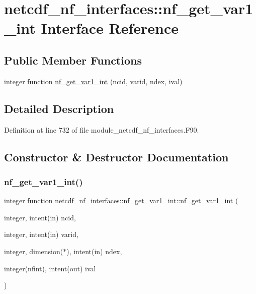 \hypertarget{interfacenetcdf__nf__interfaces_1_1nf__get__var1__int}{}\section{netcdf\+\_\+nf\+\_\+interfaces\+:\+:nf\+\_\+get\+\_\+var1\+\_\+int Interface Reference}
\label{interfacenetcdf__nf__interfaces_1_1nf__get__var1__int}
\subsection*{Public Member Functions}
\begin{DoxyCompactItemize}
\item 
integer function \hyperlink{interfacenetcdf__nf__interfaces_1_1nf__get__var1__int_a8ce4b22c50e333b201918617a4644042}{nf\+\_\+get\+\_\+var1\+\_\+int} (ncid, varid, ndex, ival)
\end{DoxyCompactItemize}


\subsection{Detailed Description}


Definition at line 732 of file module\+\_\+netcdf\+\_\+nf\+\_\+interfaces.\+F90.



\subsection{Constructor \& Destructor Documentation}
\mbox{\label{interfacenetcdf__nf__interfaces_1_1nf__get__var1__int_a8ce4b22c50e333b201918617a4644042}} 
\subsubsection{\texorpdfstring{nf\+\_\+get\+\_\+var1\+\_\+int()}{nf\_get\_var1\_int()}}
{\footnotesize\ttfamily integer function netcdf\+\_\+nf\+\_\+interfaces\+::nf\+\_\+get\+\_\+var1\+\_\+int\+::nf\+\_\+get\+\_\+var1\+\_\+int (\begin{DoxyParamCaption}\item[{integer, intent(in)}]{ncid,  }\item[{integer, intent(in)}]{varid,  }\item[{integer, dimension($\ast$), intent(in)}]{ndex,  }\item[{integer(nfint), intent(out)}]{ival }\end{DoxyParamCaption})}



